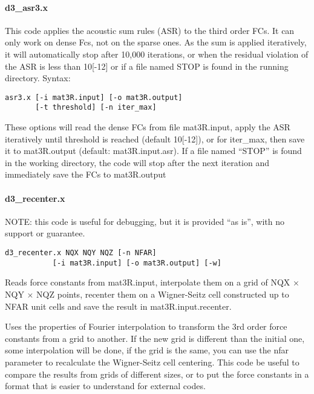 \documentclass[
]{article}
\begin{document}
\hypertarget{d3_asr3.x}{%
\paragraph{d3\_asr3.x}\label{d3_asr3.x}}

This code applies the acoustic sum rules (ASR) to the third order FCs.
It can only work on dense Fcs, not on the sparse ones. As the sum is
applied iteratively, it will automatically stop after 10,000 iterations,
or when the residual violation of the ASR is less than 10{[}-12{]} or if
a file named STOP is found in the running directory. Syntax:

\begin{verbatim}
asr3.x [-i mat3R.input] [-o mat3R.output]
       [-t threshold] [-n iter_max]
\end{verbatim}

These options will read the dense FCs from file mat3R.input, apply the
ASR iteratively until threshold is reached (default 10{[}-12{]}), or for
iter\_max, then save it to mat3R.output (default: mat3R.input.asr). If a
file named \enquote{STOP} is found in the working directory, the code
will stop after the next iteration and immediately save the FCs to
mat3R.output

\hypertarget{d3_recenter.x}{%
\paragraph{d3\_recenter.x}\label{d3_recenter.x}}

NOTE: this code is useful for debugging, but it is provided \enquote{as
is}, with no support or guarantee.

\begin{verbatim}
d3_recenter.x NQX NQY NQZ [-n NFAR]
           [-i mat3R.input] [-o mat3R.output] [-w]
\end{verbatim}

Reads force constants from mat3R.input, interpolate them on a grid of
NQX × NQY × NQZ points, recenter them on a Wigner-Seitz cell constructed
up to NFAR unit cells and save the result in mat3R.input.recenter.

Uses the properties of Fourier interpolation to transform the 3rd order
force constants from a grid to another. If the new grid is different
than the initial one, some interpolation will be done, if the grid is
the same, you can use the nfar parameter to recalculate the Wigner-Seitz
cell centering. This code be useful to compare the results from grids of
different sizes, or to put the force constants in a format that is
easier to understand for external codes.
\end{document}
